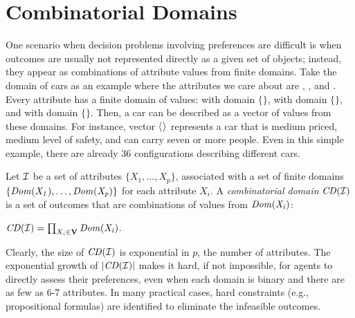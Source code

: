 \section{Combinatorial Domains \label{sec:comb_domains}}
One scenario when decision problems involving preferences are difficult is when outcomes
are usually not represented directly as a given set of objects; instead,
they appear as combinations of attribute values from finite domains.
Take the domain of cars as an example where the attributes we care about are
, , and .
Every attribute has a finite domain of values:
 with domain $\{$$\}$,
 with domain $\{$$\}$, and
 with domain $\{$$\}$.
Then, a car can be described as a vector of values from these domains.
For instance, vector $\mathit{\langle}$$\mathit{\rangle}$ represents
a car that is medium priced, medium level of safety, and can carry seven
or more people.
Even in this simple example, there are already 36 configurations describing
different cars.

\begin{definition}
	Let $\mathcal{I}$ be a set of attributes $\{X_1,\ldots,X_p\}$,
	associated with a set of finite domains $\{\it{Dom}(X_1),\ldots,\it{Dom}(X_p)\}$ for each
	attribute $X_i$.
	A \textit{combinatorial domain} $\mathit{CD}(\mathcal{I})$ is a set of outcomes 
	that are combinations of values from $\it{Dom}(X_i)$:
	\begin{center}
		$\mathit{CD}(\mathcal{I}) = \prod_{X_i \in \textbf{V}} \it{Dom}(X_i)$.
	\end{center}
\end{definition}


Clearly, the size of $\mathit{CD}(\mathcal{I})$ is exponential in $p$, the number of attributes.
The exponential growth of $|\mathit{CD}(\mathcal{I})|$ makes it hard, if not impossible, for agents
to directly assess their preferences, even when each domain is binary and
there are as few as 6-7 attributes.
In many practical cases, hard constraints (e.g., propositional
formulas) are identified to eliminate the infeasible outcomes.



